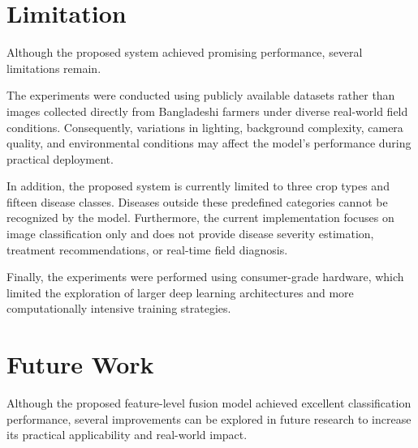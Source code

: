 \section{Limitation}

Although the proposed system achieved promising performance, several limitations remain.

The experiments were conducted using publicly available datasets rather than images collected directly from Bangladeshi farmers under diverse real-world field conditions. Consequently, variations in lighting, background complexity, camera quality, and environmental conditions may affect the model's performance during practical deployment.

In addition, the proposed system is currently limited to three crop types and fifteen disease classes. Diseases outside these predefined categories cannot be recognized by the model. Furthermore, the current implementation focuses on image classification only and does not provide disease severity estimation, treatment recommendations, or real-time field diagnosis.

Finally, the experiments were performed using consumer-grade hardware, which limited the exploration of larger deep learning architectures and more computationally intensive training strategies.

\section{Future Work}

Although the proposed feature-level fusion model achieved excellent classification performance, several improvements can be explored in future research to increase its practical applicability and real-world impact.

